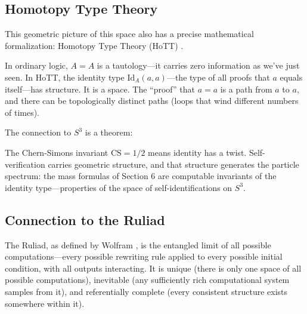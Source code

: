 \documentclass[12pt]{article}
\begin{document}
\subsection{Homotopy Type Theory}

This geometric picture of this space also has a precise mathematical formalization: Homotopy Type Theory (HoTT) \cite{hott2013}.

In ordinary logic, $A = A$ is a tautology---it carries zero information as we've just seen. In HoTT, the identity type $\mathrm{Id}_A(a, a)$---the type of all proofs that $a$ equals itself---has structure. It is a space. The ``proof'' that $a = a$ is a path from $a$ to $a$, and there can be topologically distinct paths (loops that wind different numbers of times).

The connection to $S^3$ is a theorem:

\begin{center}
\end{center}

\medskip
The Chern-Simons invariant $\mathrm{CS} = 1/2$ means identity has a twist. Self-verification carries geometric structure, and that structure generates the particle spectrum: the mass formulas of Section 6 are computable invariants of the identity type---properties of the space of self-identifications on $S^3$.

\subsection{Connection to the Ruliad}

The Ruliad, as defined by Wolfram \cite{wolfram2020}, is the entangled limit of all possible computations---every possible rewriting rule applied to every possible initial condition, with all outputs interacting. It is unique (there is only one space of all possible computations), inevitable (any sufficiently rich computational system samples from it), and referentially complete (every consistent structure exists somewhere within it).
\end{document}
